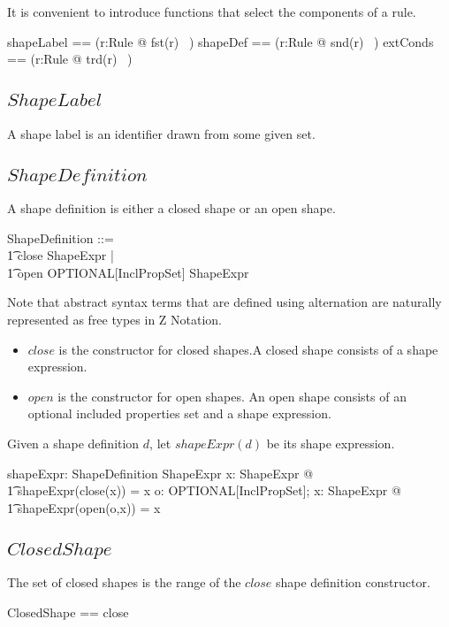\documentclass{article}
\begin{document}
It is convenient to introduce functions that select the components of a rule.
\begin{zed}
	shapeLabel == (\lambda r:Rule @ fst(r) ~)
\also
	shapeDef == (\lambda r:Rule @ snd(r) ~)
\also
	extConds == (\lambda r:Rule @ trd(r) ~)
\end{zed}

\subsection{$ShapeLabel$}
A shape label is an identifier drawn from some given set.
\begin{zed}
	[ShapeLabel]
\end{zed}

\subsection{$ShapeDefinition$}
A shape definition is either a closed shape or an open shape.
\begin{zed}
	ShapeDefinition ::= \\
\t1		close \ldata ShapeExpr \rdata | \\
\t1		open \ldata OPTIONAL[InclPropSet] \cross ShapeExpr \rdata
\end{zed}
Note that abstract syntax terms that are defined using alternation are naturally represented as free types in Z Notation.
\begin{itemize}
\item $close$ is the constructor for closed shapes.A closed shape consists of a shape expression.
\item $open$ is the constructor for open shapes. An open shape consists of an optional included properties set and a shape expression.
\end{itemize}

Given a shape definition $d$, let $shapeExpr(d)$ be its shape expression.
\begin{axdef}
	shapeExpr: ShapeDefinition \fun ShapeExpr
\where
	\forall x: ShapeExpr @ \\
\t1		shapeExpr(close(x)) = x
\also
	\forall o: OPTIONAL[InclPropSet]; x: ShapeExpr @ \\
\t1		shapeExpr(open(o,x)) = x
\end{axdef}

\subsection{$ClosedShape$}
The set of closed shapes is the range of the $close$ shape definition constructor.
\begin{zed}
	ClosedShape == \ran close
\end{zed}
\end{document}
